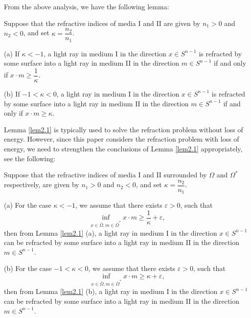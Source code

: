 \documentclass[a4paper,12pt,]{article}
\newtheorem{lemma}{\hskip\parindent\bf Lemma}[section]%
\newtheorem{remark}{\hskip\parindent\bf Remark}[section]%
\numberwithin{equation}{section}
\numberwithin{equation}{section} \allowdisplaybreaks
\begin{document}
From the above analysis, we have the following lemma:

\begin{lemma}
  Suppose that the refractive indices of media \textsc{I} and \textsc{II} are given by $n_{1}>0$ and $n_{2}<0$, and set $\kappa = \dfrac{n_{2}}{n_{1}}$.
    
    (a) If $\kappa <-1$, a light ray in medium \textsc{I} in the direction $x \in S^{n-1}$ is refracted by some surface into a light ray in medium \textsc{II} in the direction $m \in S^{n-1}$ if and only if $x\cdot m \geq \dfrac{1}{\kappa}$.
   
    (b) If $-1<\kappa <0$, a light ray in medium \textsc{I} in the direction $x \in S^{n-1}$ is refracted by some surface into a light ray in medium \textsc{II} in the direction $m \in S^{n-1}$ if and only if $x\cdot m \geq \kappa$.
\label{lem2.1}
\end{lemma}

\begin{remark}
  Lemma \ref{lem2.1} is typically used to solve the refraction problem without loss of energy. However, since this paper considers the refraction problem with loss of energy, we need to strengthen the conclusions of Lemma \ref{lem2.1} appropriately, see the following:
 
  Suppose that the refractive indices of media \textsc{I} and \textsc{II} surrounded by  $\Omega$ and $\Omega^{\ast}$ respectively, are given by $n_{1}>0$ and $n_{2}<0$, and set $\kappa = \dfrac{n_{2}}{n_{1}}$.
   
   (a) For the case $\kappa <-1$, we assume that there exists $\varepsilon >0$, such that
   \begin{equation}\label{2.6}
     \inf_{x \in \bar{\Omega}, m \in \bar{\Omega}^{\ast}} x \cdot m \geq \frac{1}{\kappa} + \varepsilon,
   \end{equation}
   then from Lemma \ref{lem2.1} (a), a light ray in medium \textsc{I} in the direction $x \in S^{n-1}$ can be refracted by some surface into a light ray in medium \textsc{II} in the direction $m \in S^{n-1}$.
   
   (b) For the case $-1<\kappa <0$, we assume that there exists $\varepsilon >0$, such that
   \begin{equation}\label{2.7}
     \inf_{x \in \bar{\Omega}, m \in \bar{\Omega}^{\ast}} x \cdot m \geq \kappa + \varepsilon,
   \end{equation}
   then from Lemma \ref{lem2.1} (b), a light ray in medium \textsc{I} in the direction $x \in S^{n-1}$ can be refracted by some surface into a light ray in medium \textsc{II} in the direction $m \in S^{n-1}$.
  \label{rem2.1}
\end{remark}
\end{document}
